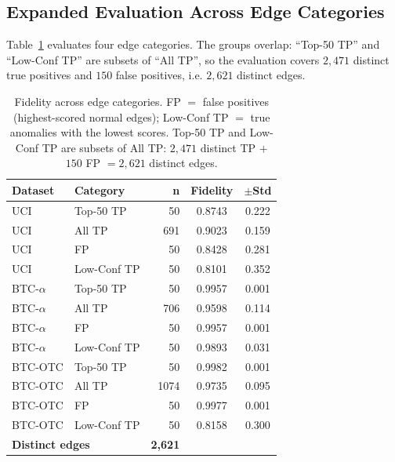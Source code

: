 \documentclass[conference]{IEEEtran}
\begin{document}
\subsection{Expanded Evaluation Across Edge Categories}

Table~\ref{tab:expanded} evaluates four edge categories. The groups overlap:
``Top-50 TP'' and ``Low-Conf TP'' are subsets of ``All TP'', so the evaluation
covers $2{,}471$ distinct true positives and $150$ false positives, i.e.
$2{,}621$ distinct edges.

\begin{table}[!t]
\centering
\caption{Fidelity across edge categories. FP $=$ false positives (highest-scored
normal edges); Low-Conf TP $=$ true anomalies with the lowest scores. Top-50 TP
and Low-Conf TP are subsets of All TP: $2{,}471$ distinct TP $+$ $150$ FP
$=2{,}621$ distinct edges.}
\label{tab:expanded}
\footnotesize
\setlength{\tabcolsep}{4pt}
\begin{tabular}{llrcc}
\toprule
\textbf{Dataset} & \textbf{Category} & \textbf{n} &
\textbf{Fidelity} & \textbf{$\pm$Std} \\
\midrule
\rowcolor{rowgray}
UCI   & Top-50 TP   &   50 & 0.8743 & 0.222 \\
UCI   & All TP      &  691 & 0.9023 & 0.159 \\
\rowcolor{rowgray}
UCI   & FP          &   50 & 0.8428 & 0.281 \\
UCI   & Low-Conf TP &   50 & 0.8101 & 0.352 \\
\midrule
\rowcolor{rowgray}
BTC-$\alpha$ & Top-50 TP   &   50 & 0.9957 & 0.001 \\
BTC-$\alpha$ & All TP      &  706 & 0.9598 & 0.114 \\
\rowcolor{rowgray}
BTC-$\alpha$ & FP          &   50 & 0.9957 & 0.001 \\
BTC-$\alpha$ & Low-Conf TP &   50 & 0.9893 & 0.031 \\
\midrule
\rowcolor{rowgray}
BTC-OTC & Top-50 TP   &   50 & 0.9982 & 0.001 \\
BTC-OTC & All TP      & 1074 & 0.9735 & 0.095 \\
\rowcolor{rowgray}
BTC-OTC & FP          &   50 & 0.9977 & 0.001 \\
BTC-OTC & Low-Conf TP &   50 & 0.8158 & 0.300 \\
\midrule
\multicolumn{2}{l}{\textbf{Distinct edges}} & \textbf{2{,}621} & & \\
\bottomrule
\end{tabular}
\end{table}
\end{document}
